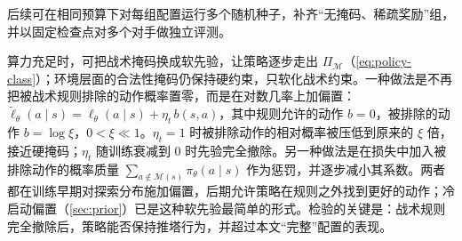 后续可在相同预算下对每组配置运行多个随机种子，补齐“无掩码、稀疏奖励”组，并以固定检查点对多个对手做独立评测。

算力充足时，可把战术掩码换成软先验，让策略逐步走出 $\Pi_{\mathcal M}$（\cref{eq:policy-class}）；环境层面的合法性掩码仍保持硬约束，只软化战术约束。一种做法是不再把被战术规则排除的动作概率置零，而是在对数几率上加偏置：$\tilde\ell_\theta(a\mid s)=\ell_\theta(a\mid s)+\eta_t\,b(s,a)$，其中规则允许的动作 $b=0$，被排除的动作 $b=\log\xi$，$0<\xi\ll1$。$\eta_t=1$ 时被排除动作的相对概率被压低到原来的 $\xi$ 倍，接近硬掩码；$\eta_t$ 随训练衰减到 \num{0} 时先验完全撤除。另一种做法是在损失中加入被排除动作的概率质量 $\sum_{a\notin\mathcal M(s)}\pi_\theta(a\mid s)$ 作为惩罚，并逐步减小其系数。两者都在训练早期对探索分布施加偏置，后期允许策略在规则之外找到更好的动作；冷启动偏置（\cref{sec:prior}）已是这种软先验最简单的形式。检验的关键是：战术规则完全撤除后，策略能否保持推塔行为，并超过本文“完整”配置的表现。
